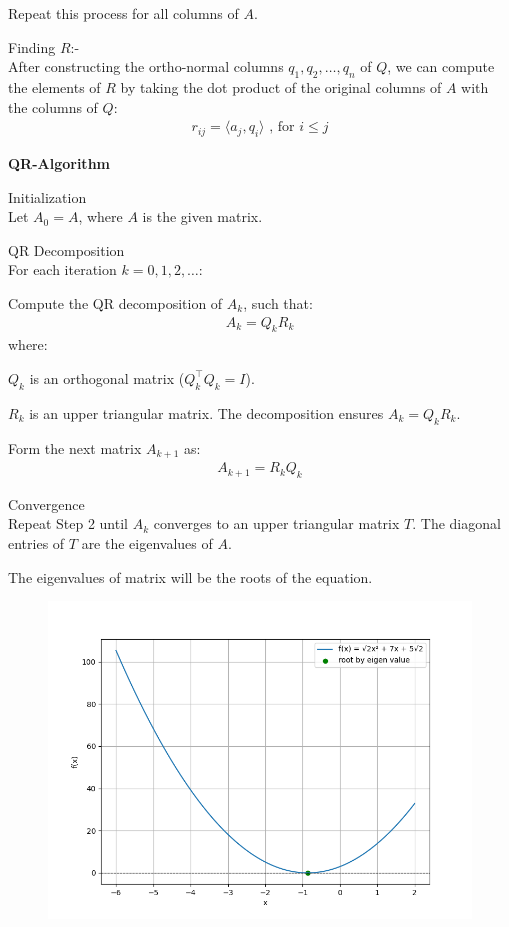 \documentclass{beamer}
\theoremstyle{remark}
\numberwithin{equation}{section}
\begin{document}
\begin{frame}[fragile]
    Repeat this process for all columns of \( A \).
    \item Finding $R$:- \\
    After constructing the ortho-normal columns $ q_1, q_2, \dots, q_n $ of $Q$, we can compute the elements of $R$ by taking the dot product of the original columns of $A$ with the columns of $Q$:
    \begin{align}
    r_{ij} = \langle a_j, q_i \rangle \text{ , for  }  i \leq j 
    \end{align}
    \item \textbf{QR-Algorithm}\\
    \item Initialization \\
    Let $A_0 = A $, where $A$ is the given matrix.
    \item QR Decomposition \\
For each iteration $ k = 0, 1, 2, \dots $:
    \item Compute the QR decomposition of \( A_k \), such that:
    \begin{align}
    A_k = Q_k R_k
    \end{align}
    where:
        \item $Q_k $ is an orthogonal matrix ($ Q_k^\top Q_k = I $).
        \item $ R_k $ is an upper triangular matrix.
    The decomposition ensures $ A_k = Q_k R_k $.

\end{frame}
\begin{frame}[fragile]
        \item Form the next matrix \( A_{k+1} \) as:
    \begin{align}
    A_{k+1} = R_k Q_k
    \end{align}
\item Convergence\\
Repeat Step 2 until $ A_k $ converges to an upper triangular matrix $ T $. The diagonal entries of $T$ are the eigenvalues of $A$.\\
\item The eigenvalues of matrix will be the roots of the equation.
\end{frame}
\begin{frame}[fragile]
    \begin{figure}[h]
    \centering
    \includegraphics[width=\columnwidth]{figs/fig.png}
 \end{figure}
\end{frame}
\end{document}
